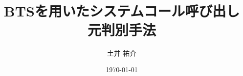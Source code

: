\documentclass[dvipdfmx,8pt]{beamer}
\title{BTSを用いたシステムコール呼び出し元判別手法}
\author{土井 祐介}
\institute{Kaori Lab., Kyushu Institute of Technology}
\date{\today}
\begin{document}
\frame[plain]{
  \titlepage
}
\addtocounter{framenumber}{-1}
\begin{frame}
  \cite{weko_148195_1} \cite{2016d} \cite{weko_157917_1} \cite{weko_148217_1} \cite{2016g}

	
	
\end{frame}

\end{document}

